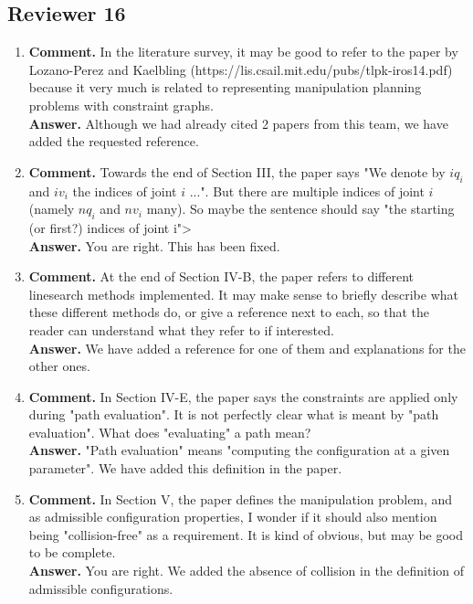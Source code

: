 \documentclass{article}
\begin{document}
\subsection*{Reviewer 16}
\begin{enumerate}
\item \textbf{Comment.} In the literature survey, it may be good to refer to
  the paper by Lozano-Perez and Kaelbling
  (https://lis.csail.mit.edu/pubs/tlpk-iros14.pdf) because it very much is
  related to representing manipulation planning problems with constraint graphs.\\
  \textbf{Answer.} Although we had already cited 2 papers from this team, we
  have added the requested reference.

\item \textbf{Comment.} Towards the end of Section III, the paper says
  "We denote by $iq_i$ and $iv_i$ the indices of joint $i$ ...". But there
  are multiple indices of joint $i$ (namely $nq_i$ and $nv_i$ many). So
  maybe the sentence should say "the starting (or first?) indices of
  joint i">\\
  \textbf{Answer.} You are right. This has been fixed.

\item \textbf{Comment.} At the end of Section IV-B, the paper refers
  to different linesearch methods implemented. It may make sense to
  briefly describe what these different methods do, or give a
  reference next to each, so that the reader can understand what they
  refer to if interested.\\
  \textbf{Answer.} We have added a reference for one of them and explanations
  for the other ones.

\item \textbf{Comment.} In Section IV-E, the paper says the
  constraints are applied only during "path evaluation". It is not
  perfectly clear what is meant by "path evaluation". What does
  "evaluating" a path mean?\\
  \textbf{Answer.} "Path evaluation" means "computing the configuration at a
  given parameter". We have added this definition in the paper.

\item \textbf{Comment.} In Section V, the paper defines the
  manipulation problem, and as admissible configuration properties, I
  wonder if it should also mention being "collision-free" as a
  requirement. It is kind of obvious, but may be good to be
  complete.\\
  \textbf{Answer.} You are right. We added the absence of collision in the
  definition of admissible configurations.


\end{enumerate}
\end{document}
